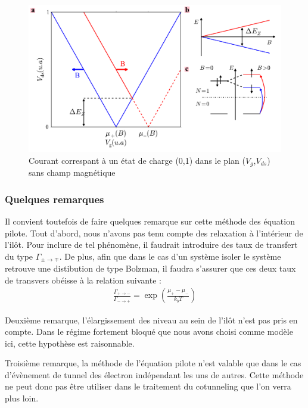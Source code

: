 \begin{figure}
\begin{center}
\includegraphics[scale=0.8]{Theorie/Transport/figure4/figure4.pdf} 
\caption{Courant correspant à un état de charge (0,1) dans le plan ($V_g$,$V_{ds}$) sans champ magnétique}
\label{SimulatedCoulombMap}
\end{center}
\end{figure}

\subsubsection{Quelques remarques}
Il convient toutefois de faire quelques remarque sur cette méthode des équation pilote. Tout d'abord, nous n'avons pas tenu compte des relaxation à l'intérieur de l'il\^ot. Pour inclure de tel phénomène, il faudrait introduire des taux de transfert du type $\Gamma_{\pm \rightarrow \mp}$. De plus, afin que dans le cas d'un système isoler le système retrouve une distibution de type Bolzman, il faudra s'assurer que ces deux taux de transvers obéisse à la relation suivante :
\begin{eqnarray}
\frac{\Gamma_{+ \rightarrow -}}{\Gamma_{- \rightarrow +}} = \exp(\frac{\mu_{+}- \mu_{-}}{k_bT}) \nonumber
\end{eqnarray}

Deuxième remarque, l'élargissement des niveau au sein de l'il\^ot n'est pas pris en compte. Dans le régime fortement bloqué que nous avons choisi comme modèle ici, cette hypothèse est raisonnable. 

Troisième remarque, la méthode de l'équation pilote n'est valable que dans le cas d'évènement de tunnel des électron indépendant les uns de autres. Cette méthode ne peut donc pas \^etre utiliser dans le traitement du cotunneling que l'on verra plus loin.